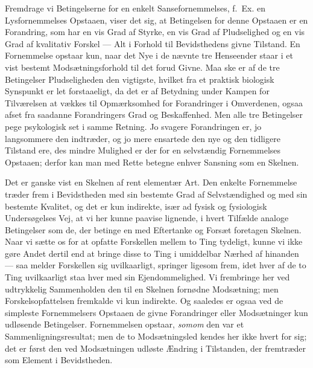 \documentclass[12pt,a4paper]{book}
\newcommand{\opage}[1]{\marginnote{\footnotesize\textit{[#1]}}}
\begin{document}
Fremdrage vi Betingelserne for en enkelt Sansefornemmelses, f.\ Ex. en
Lysfornemmelses Opstaaen, viser det sig, at Betingelsen for denne
Opstaaen er en Forandring, som har en vis Grad af Styrke, en vis Grad
af Pludselighed og en vis Grad af kvalitativ Forskel --- Alt i Forhold
til Bevidsthedens givne Tilstand. En Fornemmelse opstaar kun, naar det
Nye i de nævnte tre Henseender staar i et vist bestemt
Modsætningsforhold til det forud Givne. Maa%
\opage{38}ske er af de tre Betingelser
Pludseligheden den vigtigste, hvilket fra et praktisk biologisk
Synspunkt er let forstaaeligt, da det er af Betydning under Kampen for
Tilværelsen at vækkes til Opmærksomhed for Forandringer i Omverdenen,
ogsaa afset fra saadanne Forandringers Grad og Beskaffenhed. Men alle
tre Betingelser pege psykologisk set i samme Retning. Jo svagere
Forandringen er, jo langsommere den indtræder, og jo mere ensartede den
nye og den tidligere Tilstand ere, des mindre Mulighed er der for en
selvstændig Fornemmelses Opstaaen; derfor kan man med Rette betegne
enhver Sansning som en Skelnen.

Det er ganske vist en Skelnen af rent elementær Art. Den enkelte
Fornemmelse træder frem i Bevidstheden med sin bestemte Grad af
Selvstændighed og med sin bestemte Kvalitet, og det er kun indirekte,
især ad fysisk og fysiologisk Undersøgelses Vej, at vi her kunne
paavise lignende, i hvert Tilfælde analoge Betingelser som de, der
betinge en med Eftertanke og Forsæt foretagen Skelnen. Naar vi sætte os
for at opfatte Forskellen mellem to Ting tydeligt, kunne vi ikke gøre
Andet dertil end at bringe disse to Ting i umiddelbar Nærhed af
hinanden --- saa melder Forskellen sig uvilkaarligt, springer ligesom
frem, idet hver af de to Ting uvilkaarligt staa hver med sin
Ejendommelighed. Vi frembringe her ved udtrykkelig Sammenholden den til
en Skelnen fornødne Modsætning; men Forskelsopfattelsen fremkalde vi
kun indirekte. Og saaledes er ogsaa ved de simpleste Fornemmelsers
Opstaaen de givne Forandringer eller Modsætninger kun udløsende
Betingelser. Fornemmelsen opstaar, \emph{somom} den var et
Sammenligningsresultat; men de to Modsætningsled kendes her ikke hvert
for sig; det er først den ved Modsætningen udløste Ændring i Tilstanden,
der fremtræder som Element i Bevidstheden.
\end{document}
